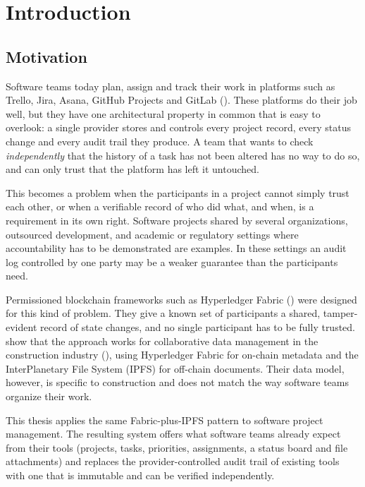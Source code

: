 \chapter{Introduction}
\label{ch:introduction}

\section{Motivation}
\label{sec:motivation}

Software teams today plan, assign and track their work in platforms such as Trello, Jira, Asana, GitHub Projects and GitLab (). These platforms do their job well, but they have one architectural property in common that is easy to overlook: a single provider stores and controls every project record, every status change and every audit trail they produce. A team that wants to check \emph{independently} that the history of a task has not been altered has no way to do so, and can only trust that the platform has left it untouched.

This becomes a problem when the participants in a project cannot simply trust each other, or when a verifiable record of who did what, and when, is a requirement in its own right. Software projects shared by several organizations, outsourced development, and academic or regulatory settings where accountability has to be demonstrated are examples. In these settings an audit log controlled by one party may be a weaker guarantee than the participants need.

Permissioned blockchain frameworks such as Hyperledger Fabric () were designed for this kind of problem. They give a known set of participants a shared, tamper-evident record of state changes, and no single participant has to be fully trusted. \textcite{adel2023} show that the approach works for collaborative data management in the construction industry (), using Hyperledger Fabric for on-chain metadata and the InterPlanetary File System (IPFS) for off-chain documents. Their data model, however, is specific to construction and does not match the way software teams organize their work.

This thesis applies the same Fabric-plus-IPFS pattern to software project management. The resulting system offers what software teams already expect from their tools (projects, tasks, priorities, assignments, a status board and file attachments) and replaces the provider-controlled audit trail of existing tools with one that is immutable and can be verified independently.

